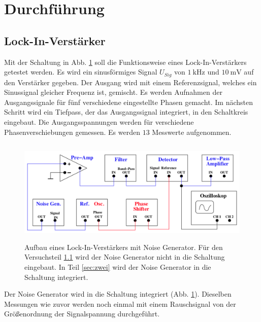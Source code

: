 \section{Durchführung}
\label{sec:Durchführung}


\subsection{Lock-In-Verstärker} %
\label{sec:eins}
Mit der Schaltung in Abb. \ref{lockin2} soll die Funktionsweise eines Lock-In-Verstärkers getestet werden.
Es wird ein sinusförmiges Signal $U_{Sig}$ von $\SI{1}{\kilo\hertz}$ und 
$\SI{10}{\milli\volt}$ auf den Verstärker gegeben.
Der Ausgang wird mit einem Referenzsignal, welches ein Sinussignal gleicher Frequenz ist, gemischt.
Es werden Aufnahmen der Ausgangssignale für fünf verschiedene eingestellte Phasen gemacht.
\newline
Im nächsten Schritt wird ein Tiefpass, der das Ausgangssignal integriert, 
in den Schaltkreis eingebaut. %
Die Ausgangsspannungen werden für verschiedene Phasenverschiebungen gemessen.
Es werden $\num{13}$ Messwerte aufgenommen. 
\begin{figure}
    \centering
    \includegraphics[width=12cm, height=5cm]{build/lockin2.png}
    \caption{Aufbau eines Lock-In-Verstärkers mit Noise Generator.
    Für den Versuchsteil \ref{sec:eins} wird der Noise Generator nicht in die 
    Schaltung eingebaut. In Teil \ref{sec:zwei} wird der Noise Generator in die 
    Schaltung integriert. \cite{V303}}
    \label{lockin2}
\end{figure}

\label{sec:zwei}
Der Noise Generator wird in die Schaltung integriert (Abb. \ref{lockin2}).
Dieselben Messungen wie zuvor werden noch einmal mit einem Rauschsignal von der Größenordnung der Signalspannung 
durchgeführt.

